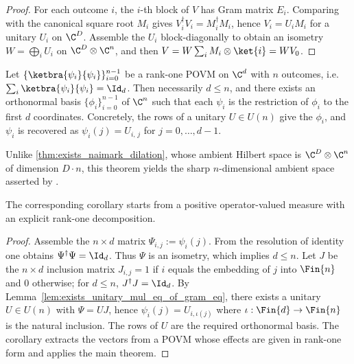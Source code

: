 \begin{proof}
    \leanok
    For each outcome $i$, the $i$-th block of $V$ has Gram matrix $E_i$.
    Comparing with the canonical square root $M_i$ gives
    $V_i^\dagger V_i=M_i^\dagger M_i$, hence $V_i=U_iM_i$ for a unitary
    $U_i$ on $\C^D$. Assemble the $U_i$ block-diagonally to obtain an
    isometry $W=\bigoplus_iU_i$ on $\C^D\otimes\C^n$, and then
    $V=W\sum_iM_i\otimes\ket{i}=WV_0$.
\end{proof}

\begin{theorem}
    \label{thm:sharp_rank_one_naimark}
    \leanok
    Let $\{\ketbra{\psi_i}{\psi_i}\}_{i=0}^{n-1}$ be a rank-one POVM on
    $\C^d$ with $n$ outcomes, i.e.\
    $\sum_i\ketbra{\psi_i}{\psi_i}=\Id_d$.  Then necessarily $d\le n$,
    and there exists an orthonormal basis
    $\{\phi_i\}_{i=0}^{n-1}$ of $\C^n$ such that each $\psi_i$ is the
    restriction of $\phi_i$ to the first $d$ coordinates.
    Concretely, the rows of a unitary $U\in U(n)$ give the $\phi_i$, and
    $\psi_i$ is recovered as $\psi_i(j)=U_{i,\,j}$ for
    $j=0,\dots,d-1$.

    Unlike \ref{thm:exists_naimark_dilation}, whose ambient Hilbert space
    is $\C^D\otimes\C^n$ of dimension $D\cdot n$, this theorem yields the
    sharp $n$-dimensional ambient space asserted by
    \cite[Theorem ``Neumark's theorem'']{Wolf2012Quantum}.

    The corresponding corollary starts from a positive operator-valued
    measure with an explicit rank-one decomposition.
\end{theorem}

\begin{proof}
    \leanok
    Assemble the $n\times d$ matrix $\Psi_{i,j}:=\psi_i(j)$.  From the
    resolution of identity one obtains $\Psi^\dagger\Psi=\Id_d$.
    Thus $\Psi$ is an isometry, which implies $d\le n$.
    Let $J$ be the $n\times d$ inclusion matrix
    $J_{i,j}=1$ if $i$ equals the embedding of $j$ into $\Fin{n}$ and $0$
    otherwise; for $d\le n$, $J^\dagger J=\Id_d$.
    By Lemma~\ref{lem:exists_unitary_mul_eq_of_gram_eq}, there exists a
    unitary $U\in U(n)$ with $\Psi=UJ$, hence
    $\psi_i(j)=U_{i,\iota(j)}$ where $\iota:\Fin{d}\to\Fin{n}$ is the
    natural inclusion.  The rows of $U$ are the required orthonormal
    basis.  The corollary extracts the vectors from a POVM whose
    effects are given in rank-one form and applies the main theorem.
\end{proof}

